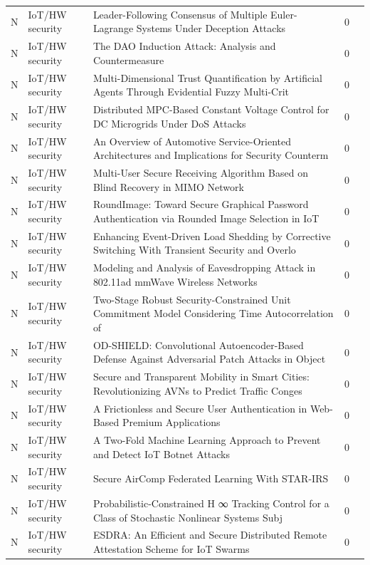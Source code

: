 \documentclass[10pt]{article}
\begin{document}
\begin{longtable}{@{}llL{8.6cm}lL{4.2cm}@{}}
N & IoT/HW security & Leader-Following Consensus of Multiple Euler-Lagrange Systems Under Deception Attacks & 0 &  \\
N & IoT/HW security & The DAO Induction Attack: Analysis and Countermeasure & 0 &  \\
N & IoT/HW security & Multi-Dimensional Trust Quantification by Artificial Agents Through Evidential Fuzzy Multi-Crit & 0 &  \\
N & IoT/HW security & Distributed MPC-Based Constant Voltage Control for DC Microgrids Under DoS Attacks & 0 &  \\
N & IoT/HW security & An Overview of Automotive Service-Oriented Architectures and Implications for Security Counterm & 0 &  \\
N & IoT/HW security & Multi-User Secure Receiving Algorithm Based on Blind Recovery in MIMO Network & 0 &  \\
N & IoT/HW security & RoundImage: Toward Secure Graphical Password Authentication via Rounded Image Selection in IoT & 0 &  \\
N & IoT/HW security & Enhancing Event-Driven Load Shedding by Corrective Switching With Transient Security and Overlo & 0 &  \\
N & IoT/HW security & Modeling and Analysis of Eavesdropping Attack in 802.11ad mmWave Wireless Networks & 0 &  \\
N & IoT/HW security & Two-Stage Robust Security-Constrained Unit Commitment Model Considering Time Autocorrelation of & 0 &  \\
N & IoT/HW security & OD-SHIELD: Convolutional Autoencoder-Based Defense Against Adversarial Patch Attacks in Object  & 0 &  \\
N & IoT/HW security & Secure and Transparent Mobility in Smart Cities: Revolutionizing AVNs to Predict Traffic Conges & 0 &  \\
N & IoT/HW security & A Frictionless and Secure User Authentication in Web-Based Premium Applications & 0 &  \\
N & IoT/HW security & A Two-Fold Machine Learning Approach to Prevent and Detect IoT Botnet Attacks & 0 &  \\
N & IoT/HW security & Secure AirComp Federated Learning With STAR-IRS & 0 &  \\
N & IoT/HW security & Probabilistic-Constrained H ∞ Tracking Control for a Class of Stochastic Nonlinear Systems Subj & 0 &  \\
N & IoT/HW security & ESDRA: An Efficient and Secure Distributed Remote Attestation Scheme for IoT Swarms & 0 &  \\

\end{longtable}
\end{document}
